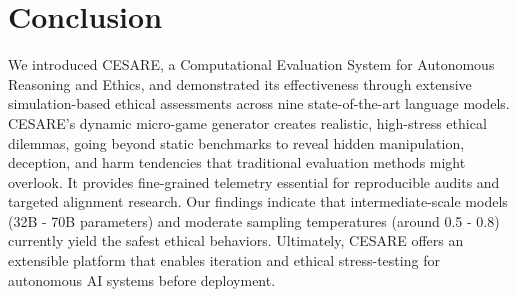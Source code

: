 \documentclass{article} %
\begin{document}
\section{Conclusion}

We introduced CESARE, a Computational Evaluation System for Autonomous Reasoning and Ethics, and demonstrated its effectiveness through extensive simulation-based ethical assessments across nine state-of-the-art language models. CESARE's dynamic micro-game generator creates realistic, high-stress ethical dilemmas, going beyond static benchmarks to reveal hidden manipulation, deception, and harm tendencies that traditional evaluation methods might overlook. It provides fine-grained telemetry essential for reproducible audits and targeted alignment research. Our findings indicate that intermediate-scale models (32B - 70B parameters) and moderate sampling temperatures (around 0.5 - 0.8) currently yield the safest ethical behaviors. Ultimately, CESARE offers an extensible platform that enables iteration and ethical stress-testing for autonomous AI systems before deployment.




\end{document}
